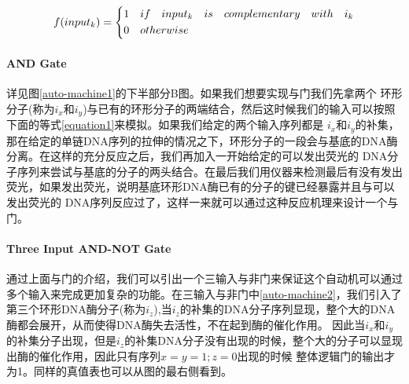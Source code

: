 \documentclass[a4paper,twoside]{article}
\begin{document}
\begin{equation}
	\centering
	f(input_k)=\left\{
	\begin{aligned}
		1 & \quad if \quad input_k \quad is \quad complementary \quad with \quad i_k \\
		0 & \quad otherwise
	\end{aligned}
	\right.
	\label{equation1}
\end{equation}

\paragraph{AND Gate}详见图\ref{auto-machine1}的下半部分B图。如果我们想要实现与门我们先拿两个
环形分子(称为$i_x$和$i_y$)与已有的环形分子的两端结合，然后这时候我们的输入可以按照下面的等式\ref{equation1}来模拟。如果我们给定的两个输入序列都是
$i_x$和$i_y$的补集，那在给定的单链DNA序列的拉伸的情况之下，环形分子的一段会与基底的DNA酶分离。在这样的充分反应之后，我们再加入一开始给定的可以发出荧光的
DNA分子序列来尝试与基底的分子的两头结合。在最后我们用仪器来检测最后有没有发出荧光，如果发出荧光，说明基底环形DNA酶已有的分子的键已经暴露并且与可以发出荧光的
DNA序列反应过了，这样一来就可以通过这种反应机理来设计一个与门。

\paragraph{Three Input AND-NOT Gate}
通过上面与门的介绍，我们可以引出一个三输入与非门来保证这个自动机可以通过多个输入来完成更加复杂的功能。在三输入与非门中\ref{auto-machine2}，我们引入了
第三个环形DNA酶分子(称为$i_z$),当$i_z$的补集的DNA分子序列显现，整个大的DNA酶都会展开，从而使得DNA酶失去活性，不在起到酶的催化作用。
因此当$i_x$和$i_y$的补集分子出现，但是$i_z$的补集DNA分子没有出现的时候，整个大的分子可以显现出酶的催化作用，因此只有序列$x = y = 1; z = 0$出现的时候
整体逻辑门的输出才为1。同样的真值表也可以从图的最右侧看到。
\end{document}
